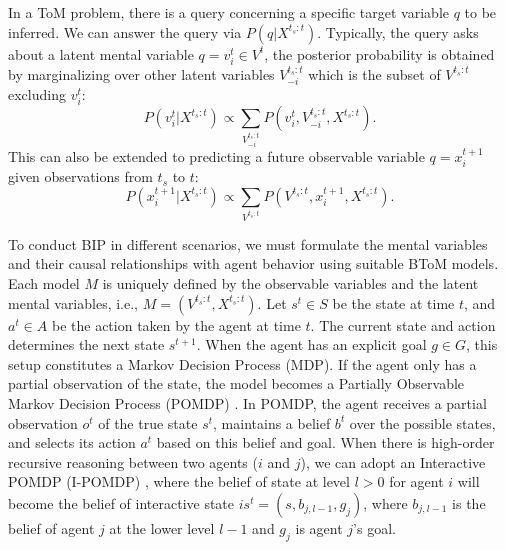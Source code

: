 In a ToM problem, there is a query concerning a specific target variable $q$ to be inferred. We can answer the query via $P(q | X^{t_s:t})$. Typically, the query asks about a latent mental variable $q = v_i^t \in V^t$, the posterior probability is obtained by marginalizing over other latent variables $V_{-i}^{t_s:t}$ which is the subset of $V^{t_s:t}$ excluding $v_i^t$:
\begin{equation}
 P(v_i^t| X^{t_{s}:t}) \propto \sum_{V_{-i}^{t_s:t}} P(v_i^t, V_{-i}^{t_{s}:t}, X^{t_{s}:t})
\label{eq:latent_posterior}.
\end{equation}
This can also be extended to predicting a future observable variable $q = x_i^{t+1}$ given observations from $t_{s}$ to $t$:
\begin{equation}
 P(x_i^{t+1}| X^{t_{s}:t}) \propto \sum_{V^{t_{s}:t}} P(V^{t_{s}:t}, x_i^{t+1}, X^{t_{s}:t}).
\label{eq:prediction}
\end{equation}

To conduct BIP in different scenarios, we must formulate the mental variables and their causal relationships with agent behavior using suitable BToM models. Each model $M$ is uniquely defined by the observable variables and the latent mental variables, i.e., $M = (V^{t_s:t}, X^{t_s:t})$. Let $s^t \in S$ be the state at time $t$, and $a^t \in A$ be the action taken by the agent at time $t$. The current state and action determines the next state $s^{t+1}$. When the agent has an explicit goal $g \in G$, this setup constitutes a Markov Decision Process (MDP). If the agent only has a partial observation of the state, the model becomes a Partially Observable Markov Decision Process (POMDP) \cite{kaelbling1998planning}. In POMDP, the agent receives a partial observation $o^t$ of the true state $s^t$, maintains a belief $b^t$ over the possible states, and selects its action $a^t$ based on this belief and goal. When there is high-order recursive reasoning between two agents ($i$ and $j$), we can adopt an Interactive POMDP (I-POMDP) \cite{gmytrasiewicz2005framework}, where the belief of state at level $l > 0$ for agent $i$ will become the belief of interactive state $is^t = (s, b_{j,l-1}, g_{j})$, where $b_{j,l-1}$ is the belief of agent $j$ at the lower level $l-1$ and $g_j$ is agent $j$'s goal.


